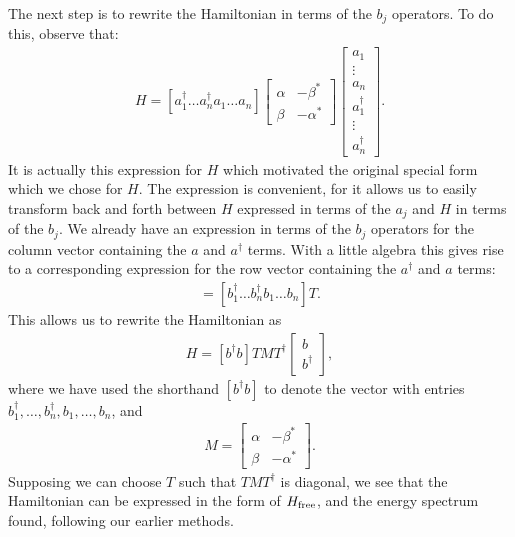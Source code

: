 \documentclass[12pt]{article}
\begin{document}
{The next step is to rewrite the Hamiltonian in terms of the $b_j$
operators.  To do this, observe that:
\begin{eqnarray}
  H = [ a_1^\dagger \ldots a_n^\dagger a_1 \ldots a_n ]
  \left[ \begin{array}{cc} \alpha & -\beta^* \\ \beta & -\alpha^*
      \end{array} \right]
    \left[ \begin{array}{c} a_1 \\ \vdots \\ a_n \\ a_1^\dagger \\
        \vdots \\ a_n^\dagger \end{array} \right].
\end{eqnarray}
It is actually this expression for $H$ which motivated the original
special form which we chose for $H$.  The expression is convenient,
for it allows us to easily transform back and forth between $H$
expressed in terms of the $a_j$ and $H$ in terms of the $b_j$.  We
already have an expression in terms of the $b_j$ operators for the
column vector containing the $a$ and $a^\dagger$ terms.  With a little
algebra this gives rise to a corresponding expression for the row
vector containing the $a^\dagger$ and $a$ terms:
\begin{eqnarray}
  [a_1^\dagger \ldots a_n^\dagger a_1 \ldots a_n]
  = [b_1^\dagger \ldots b_n^\dagger b_1 \ldots b_n] T.
\end{eqnarray}
This allows us to rewrite the Hamiltonian as
\begin{eqnarray}
  H = 
  [b^\dagger b]
  T M T^\dagger
  \left[ \begin{array}{c} b \\
    b^\dagger \end{array} \right],
\end{eqnarray}
where we have used the shorthand $[b^\dagger b]$ to denote the vector
with entries $b_1^\dagger, \ldots, b_n^\dagger,b_1,\ldots,b_n$, and
\begin{eqnarray}
  M = \left[ \begin{array}{cc} \alpha & -\beta^* \\ \beta & -\alpha^*
      \end{array} \right].
\end{eqnarray}
Supposing we can choose $T$ such that $TMT^\dagger$ is diagonal, we
see that the Hamiltonian can be expressed in the form of $H_{\rm
  free}$, and the energy spectrum found, following our earlier methods.

}
\end{document}
